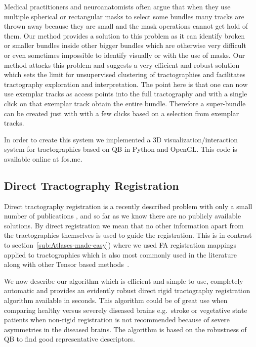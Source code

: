 \documentclass[preprint,authoryear,a4paper,10pt,onecolumn]{elsarticle}
\begin{document}
Medical practitioners and neuroanatomists often argue that when they use
multiple spherical or rectangular masks to select some bundles many
tracks are thrown away because they are small and the mask operations
cannot get hold of them. Our method provides a solution to this problem
as it can identify broken or smaller bundles inside other bigger bundles
which are otherwise very difficult or even sometimes impossible to
identify visually or with the use of masks. Our method attacks this
problem and suggests a very efficient and robust solution which sets the
limit for unsupervised clustering of tractographies and facilitates
tractography exploration and interpretation. The point here is that one
can now use exemplar tracks as access points into the full tractography
and with a single click on that exemplar track obtain the entire bundle.
Therefore a super-bundle can be created just with with a few clicks
based on a selection from exemplar tracks.

In order to create this system we implemented a 3D
visualization/interaction system for tractographies based on QB in
Python and OpenGL. This code is available online at fos.me.


\subsection{Direct Tractography Registration}

Direct tractography registration is a recently described problem with
only a small number of publications \citep{leemans2006multiscale,
  mayer2008bundles, mayerdirect, mayer2011supervised,
  durrleman2010registration, zvitia2008adaptive, Zvitia2010,
  ZiyanMICCAI07}, and so far as we know there are no publicly available
solutions. By direct registration we mean that no other information
apart from the tractographies themselves is used to guide the
registration. This is in contrast to
section~\ref{sub:Atlases-made-easy}) where we used FA registration
mappings applied to tractographies which is also most commonly used in
the literature along with other Tensor based
methods~\citep{goh2006algebraic}.

We now describe our algorithm which is efficient and simple
to use, completely automatic and provides an evidently robust direct
rigid tractography registration algorithm available in seconds. This
algorithm could be of great use when comparing healthy versus severely
diseased brains e.g.~stroke or vegetative state patients when non-rigid
registration is not recommended because of severe asymmetries in the
diseased brains. The algorithm is based on the robustness of QB to find
good representative descriptors.
\end{document}
